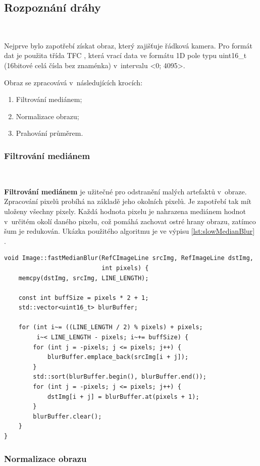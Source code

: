\subsection{Rozpoznání dráhy}\

Nejprve bylo zapotřebí získat obraz, který zajišťuje řádková kamera. Pro formát dat
je použita třída TFC \cite{draha}, která vrací data ve formátu 1D pole typu 
uint16\_t (16bitové celá čísla bez znaménka) v~intervalu <0; 4095>.

Obraz se zpracovává v~následujících krocích:
\begin{enumerate}
    \item Filtrování mediánem;
    \item Normalizace obrazu;
    \item Prahování průměrem.
\end{enumerate}

\subsubsection*{Filtrování mediánem}\

\textbf{Filtrování mediánem} je užitečné pro odstranění malých artefaktů v~obraze.
Zpracování pixelů probíhá na základě jeho okolních pixelů. Je zapotřebí tak mít
uloženy všechny pixely. Každá hodnota pixelu je nahrazena mediánem hodnot v~určitém
okolí daného pixelu, což pomáhá zachovat ostré hrany obrazu, zatímco šum je
redukován. Ukázka použitého algoritmu je ve výpisu \ref{lst:slowMedianBlur} 
\cite{draha}\cite{robot}.

\begin{lstlisting}[caption = Filtrování mediánem, label = lst:slowMedianBlur]
void Image::fastMedianBlur(RefCImageLine srcImg, RefImageLine dstImg,
                           int pixels) {
    memcpy(dstImg, srcImg, LINE_LENGTH);

    const int buffSize = pixels * 2 + 1;
    std::vector<uint16_t> blurBuffer;

    for (int i~= ((LINE_LENGTH / 2) % pixels) + pixels;
         i~< LINE_LENGTH - pixels; i~+= buffSize) {
        for (int j = -pixels; j <= pixels; j++) {
            blurBuffer.emplace_back(srcImg[i + j]);
        }
        std::sort(blurBuffer.begin(), blurBuffer.end());
        for (int j = -pixels; j <= pixels; j++) {
            dstImg[i + j] = blurBuffer.at(pixels + 1);
        }
        blurBuffer.clear();
    }
}
\end{lstlisting}

\subsubsection*{Normalizace obrazu}\

